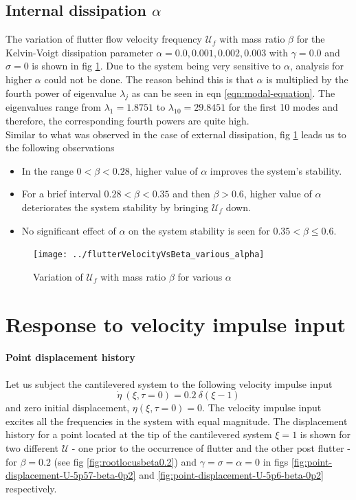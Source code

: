 \documentclass[12pt]{report}
\begin{document}
\subsection{Internal dissipation $\alpha$}
The variation of flutter flow velocity frequency $\mathcal{U}_f$ with mass ratio $\beta$ for the Kelvin-Voigt dissipation parameter $\alpha = 0.0, 0.001, 0.002, 0.003$ with $\gamma = 0.0$ and $\sigma = 0$ is shown in fig \ref{fig:flutter-velocity-vs-beta-various-alpha}. Due to the system being very sensitive to $\alpha$, analysis for higher $\alpha$ could not be done. The reason behind this is that $\alpha$ is multiplied by the fourth power of eigenvalue $\lambda_j$ as can be seen in eqn \ref{eqn:modal-equation}. The eigenvalues range from $\lambda_1 = 1.8751$ to $\lambda_{10} = 29.8451$ for the first 10 modes and therefore, the corresponding fourth powers are quite high. \\
Similar to what was observed in the case of external dissipation, fig \ref{fig:flutter-velocity-vs-beta-various-alpha} leads us to the following observations
\begin{itemize}
	\item In the range $0 < \beta < 0.28$, higher value of $\alpha$ improves the system's stability.
	
	\item For a brief interval $0.28 < \beta < 0.35$ and then $\beta > 0.6$, higher value of $\alpha$ deteriorates the system stability by bringing $\mathcal{U}_f$ down.
	
	\item No significant effect of $\alpha$ on the system stability is seen for $0.35 < \beta \leq 0.6$.
\end{itemize}

\begin{figure}[h!]
	\centering
	\texttt{[image: ../flutterVelocityVsBeta\_various\_alpha]}
	\caption{Variation of $\mathcal{U}_f$ with mass ratio $\beta$ for various $\alpha$}
	\label{fig:flutter-velocity-vs-beta-various-alpha}
\end{figure}


\cleardoublepage
\section{Response to velocity impulse input}
\paragraph{Point displacement history} Let us subject the cantilevered system to the following velocity impulse input 
$$\dot{\eta} ~(\xi, \tau = 0) = 0.2~\delta (\xi - 1)$$
and zero initial displacement, $\eta (\xi, \tau = 0) = 0$. The velocity impulse input excites all the frequencies in the system with equal magnitude.
The displacement history for a point located at the tip of the cantilevered system $\xi = 1$ is shown for two different $\mathcal{U}$ - one prior to the occurrence of flutter and the other post flutter - for $\beta = 0.2$ (see fig \ref{fig:rootlocusbeta0.2}) and $\gamma = \sigma = \alpha = 0$ in figs  \ref{fig:point-displacement-U-5p57-beta-0p2} and \ref{fig:point-displacement-U-5p6-beta-0p2} respectively.
\end{document}
